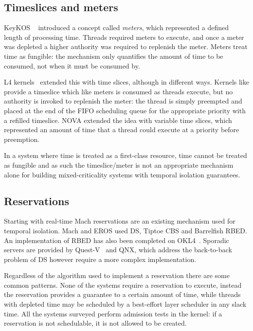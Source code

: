 \subsection{Timeslices and meters}

KeyKOS ~\citep{Bomberger_FFHLS_92} introduced a concept called \emph{meters}, which represented a
defined length of processing time. Threads required meters to execute, and once a meter was depleted
a higher authority was required to replenish the meter. Meters treat time as fungible: the mechanism
only quantifies the amount of time to be consumed, not when it must be consumed by.

L4 kernels~\citep{Elphinstone_Heiser_13} extended this with time slices, although in different ways.
Kernels like \selfour provide a timeslice which like meters is consumed as threads execute, but no
authority is invoked to replenish the meter: the thread is simply preempted and placed at the end of
the \gls{FIFO} scheduling queue for the appropriate priority with a refilled timeslice. NOVA
extended the idea with variable time slices, which represented an amount of time that a thread could
execute at a priority before preemption.

In a system where time is treated as a first-class resource, time cannot be treated as fungible and
as such the timeslice/meter is not an appropriate mechanism alone for building mixed-criticality
systems with temporal isolation guarantees.

\subsection{Reservations}

Starting with real-time Mach reservations are an existing mechanism used for temporal isolation.
Mach and EROS used \gls{DS}, Tiptoe \gls{CBS} and Barrelfish \gls{RBED}. 
An implementation of RBED has also been completed on OKL4~\citep{Petters_LHE_09}.
Sporadic servers are provided by Quest-V~\citep{Li_WCM_14} and QNX, which address the back-to-back
problem of \gls{DS} however require a more complex implementation.

Regardless of the algorithm used to implement a reservation there are some common patterns.  None of
the systems require a reservation to execute, instead the reservation provides a guarantee to a
certain amount of time, while threads with depleted time may be scheduled by a best-effort layer
scheduler in any slack time. All the systems surveyed perform admission tests in the kernel: if a
reservation is not schedulable, it is not allowed to be created. 

